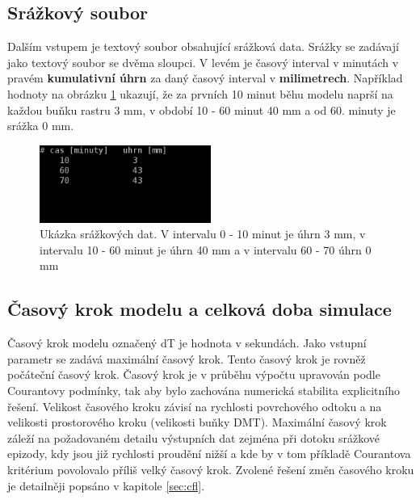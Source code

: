 \subsection{Srážkový soubor} \label{sec:vstupsrazka}

Dalším vstupem je textový soubor obsahující srážková data. 
% 
% 
% 
Srážky se zadávají jako textový soubor se dvěma sloupci. V levém je časový interval v minutách v pravém \textbf{kumulativní úhrn} za daný časový interval v \textbf{milimetrech}. Například hodnoty na obrázku \ref{fig:srazkovysoubor} ukazují, že za prvních 10 minut běhu modelu naprší  na každou buňku rastru 3 mm, v období 10 - 60 minut 40 mm a od 60. minuty je srážka 0 mm. 
\begin{figure}
  \centering
  \includegraphics[width=0.5\textwidth]{./img/srazka.png}
  \caption{Ukázka srážkových dat. V intervalu 0 - 10 minut je úhrn 3 mm, v intervalu 10 - 60 minut je úhrn 40 mm a v intervalu 60 - 70 úhrn 0 mm}
  \label{fig:srazkovysoubor}
\end{figure}


\subsection{Časový krok modelu a celková doba simulace} \label{sec:vstupkrok}

Časový krok modelu označený \acs{dT} je hodnota v sekundách. Jako vstupní parametr se zadává maximální časový krok. Tento časový krok je rovněž počáteční časový krok. Časový krok je v průběhu výpočtu upravován podle Courantovy podmínky, tak aby bylo zachována numerická stabilita explicitního řešení. Velikost časového kroku závisí na rychlosti povrchového odtoku a na velikosti prostorového kroku (velikosti buňky DMT). Maximální časový krok záleží na požadovaném detailu výstupních dat zejména při dotoku srážkové epizody, kdy jsou již rychlosti proudění nižší a kde by v tom příkladě Courantova kritérium povolovalo příliš velký časový krok. Zvolené řešení změn časového kroku je detailněji popsáno v kapitole \ref{sec:cfl}. 

